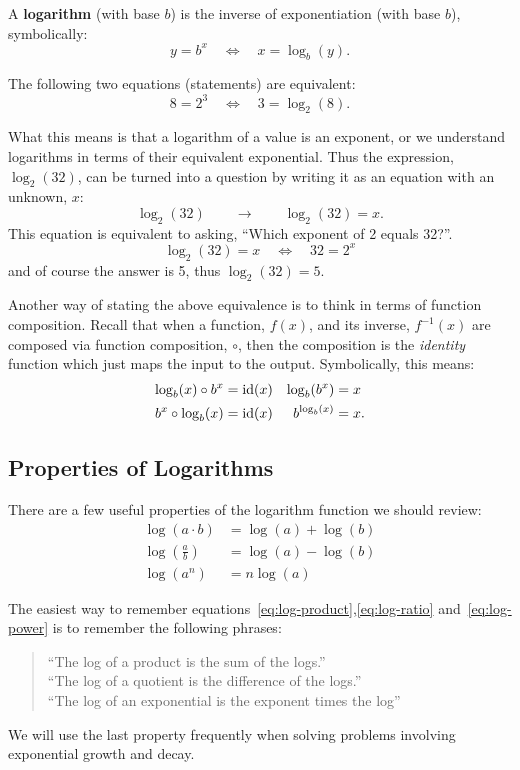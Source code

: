 A \textbf{logarithm} (with base \(b\)) is the inverse of
exponentiation (with base \(b\)), symbolically:
\[
  y = {b}^{x} \quad \Leftrightarrow \quad x = \log_{b}(y).
\]
\begin{example}
  The following two equations (statements) are equivalent:
  \[
    8 = 2^{3} \quad \Leftrightarrow \quad 3 = \log_{2}(8).
  \]
\end{example}
What this means is that a logarithm of a value is an exponent, or we
understand logarithms in terms of their equivalent exponential. Thus
the expression, \(\log_{2}(32)\), can be turned into a question by
writing it as an equation with an unknown, \(x\):
\[
  \log_{2}(32) \qquad \longrightarrow \qquad \log_{2}(32) = x.
\]
This equation is equivalent to asking, ``Which
exponent of 2 equals 32?''.
\[
  \log_{2}(32) = x \quad \Leftrightarrow \quad 32 = 2^{x}
\]
and of course the answer is 5, thus \(\log_{2}(32) = 5\).

Another way of stating the above equivalence is to think in terms of
function composition. Recall that when a function, \(f(x)\), and its
inverse, \(f^{-1}(x)\) are composed via function composition, \ie{}
\(\circ\), then the composition is the \emph{identity} function which
just maps the input to the output. Symbolically, this means:
\begin{align*}
  \log_{b}(x) \circ b^{x} &= \textrm{id}(x) & \log_{b}(b^{x}) &= x \\
  b^{x} \circ \log_{b}(x) &= \textrm{id}(x) & b^{\log_{b}(x)} &= x.
\end{align*}

\subsection{Properties of Logarithms}%
\label{sub:properties-logarithms}


There are a few useful properties of the logarithm function we should
review:
\begin{align}  %
  \log(a\cdot b) &= \log(a) + \log(b) \label{eq:log-product}\\
  \log\left( \frac{a}{b} \right) &= \log(a) - \log(b) \label{eq:log-ratio}\\
  \log\left( a^{n} \right) &= n \log(a) \label{eq:log-power}
\end{align}

The easiest way to remember
equations~\eqref{eq:log-product},\eqref{eq:log-ratio}
and~\eqref{eq:log-power} is to remember the following phrases:
\begin{quote}
  ``The log of a product is the sum of the logs.''\\
  ``The log of a quotient is the difference of the logs.''\\
  ``The log of an exponential is the exponent times the log''
\end{quote}
We will use the last property frequently when solving problems
involving exponential growth and decay.

